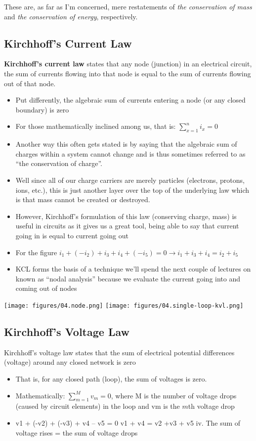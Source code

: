 \documentclass[11pt]{book}
\begin{document}
These are, as far as I’m concerned, mere restatements of \textit{the conservation of mass} and \textit{the conservation of energy}, respectively.


\subsection{Kirchhoff's Current Law}
\textbf{Kirchhoff's current law} states that any node (junction) in an electrical circuit, the sum of currents flowing into that node is equal to the sum of currents flowing out of that node.

\begin{itemize}
	\item Put differently, the algebraic sum of currents entering a node (or any closed boundary) is zero
	\item For those mathematically inclined among us, that is: $\sum_{x=1}^n i_x = 0$
	\item Another way this often gets stated is by saying that the algebraic sum of charges within a system cannot change and is thus sometimes referred to as ``the conservation of charge''.
	\item Well since all of our charge carriers are merely particles (electrons, protons, ions, etc.), this is just another layer over the top of the underlying law which is that mass cannot be created or destroyed.
	\item However, Kirchhoff's formulation of this law (conserving charge, mass) is useful in circuits as it gives us a great tool, being able to say that current going in is equal to current going out
	\item For the figure $i_1 + (-i_2) + i_3 + i_4 + (-i_5) = 0 \rightarrow i_1 +i_3 + i_4 = i_2 + i_5$
	\item KCL forms the basis of a technique we’ll spend the next couple of lectures on known as “nodal analysis” because we evaluate the current going into and coming out of nodes
\end{itemize}

\texttt{[image: figures/04.node.png]}
\texttt{[image: figures/04.single-loop-kvl.png]}

\subsection{Kirchhoff's Voltage Law}
Kirchhoff's voltage law states that the sum of electrical potential differences (voltage) around any closed network is zero
\begin{itemize}
	\item That is, for any closed path (loop), the sum of voltages is zero.
	\item Mathematically: $\sum_{m=1}^{M} v_m = 0$, where M is the number of voltage drops (caused by circuit elements) in the loop and vm is the $m$th voltage drop
	\item v1 + (-v2) + (-v3) + v4 – v5 = 0
v1 + v4 = v2 +v3 + v5
iv.	The sum of voltage rises = the sum of voltage drops
\end{itemize}
\end{document}
